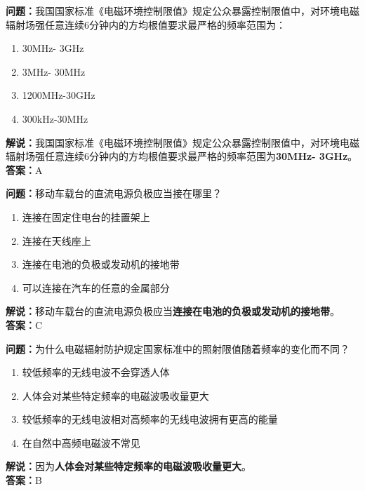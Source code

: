 \documentclass{ctexbook}
\begin{document}
\noindent\textbf{问题：}我国国家标准《电磁环境控制限值》规定公众暴露控制限值中，对环境电磁辐射场强任意连续6分钟内的方均根值要求最严格的频率范围为： 
\begin{enumerate}[label=\Alph*), leftmargin=3em]
	\item 30MHz- 3GHz
	\item 3MHz- 30MHz
	\item 1200MHz-30GHz
	\item 300kHz-30MHz
\end{enumerate}
\noindent\textbf{解说：}我国国家标准《电磁环境控制限值》规定公众暴露控制限值中，对环境电磁辐射场强任意连续6分钟内的方均根值要求最严格的频率范围为\textbf{30MHz- 3GHz}。\\
\textbf{答案：}A

\bigskip


\noindent\textbf{问题：}移动车载台的直流电源负极应当接在哪里？
\begin{enumerate}[label=\Alph*), leftmargin=3em]
	\item 连接在固定住电台的挂置架上
	\item 连接在天线座上
	\item 连接在电池的负极或发动机的接地带
	\item 可以连接在汽车的任意的金属部分
\end{enumerate}
\noindent\textbf{解说：}移动车载台的直流电源负极应当\textbf{连接在电池的负极或发动机的接地带}。\\
\textbf{答案：}C

\bigskip


\noindent\textbf{问题：}为什么电磁辐射防护规定国家标准中的照射限值随着频率的变化而不同？
\begin{enumerate}[label=\Alph*), leftmargin=3em]
	\item 较低频率的无线电波不会穿透人体
	\item 人体会对某些特定频率的电磁波吸收量更大
	\item 较低频率的无线电波相对高频率的无线电波拥有更高的能量
	\item 在自然中高频电磁波不常见
\end{enumerate}
\noindent\textbf{解说：}因为\textbf{人体会对某些特定频率的电磁波吸收量更大}。\\
\textbf{答案：}B






%
\end{document}
